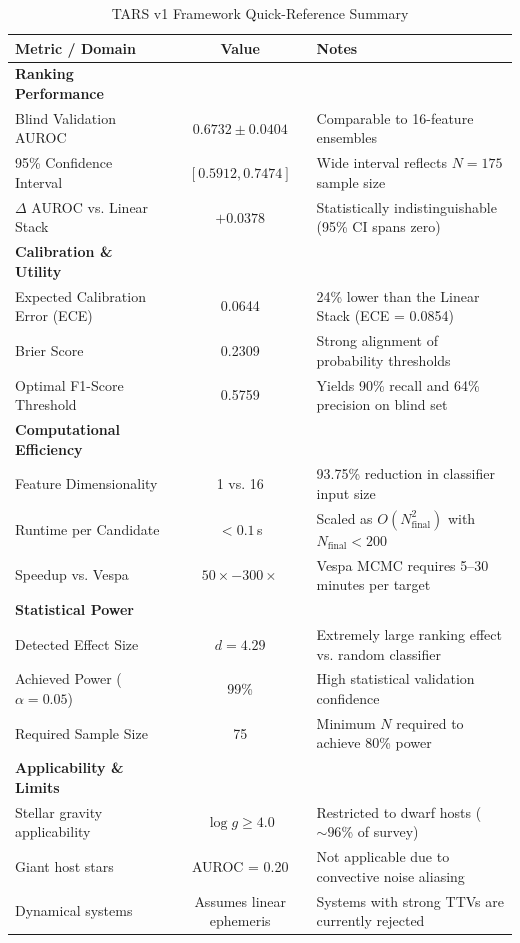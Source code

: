 \begin{table}[htbp]
\centering
\caption{TARS v1 Framework Quick-Reference Summary}
\label{tab:quick_reference}
\begin{tabular}{lcl}
\hline\hline
Metric / Domain & Value & Notes \\
\hline
\textbf{Ranking Performance} & & \\
Blind Validation AUROC & $0.6732 \pm 0.0404$ & \parbox{8.0cm}{Comparable to 16-feature ensembles} \\
95\% Confidence Interval & $[0.5912, 0.7474]$ & \parbox{8.0cm}{Wide interval reflects $N=175$ sample size} \\
$\Delta$ AUROC vs. Linear Stack & $+0.0378$ & \parbox{8.0cm}{Statistically indistinguishable (95\% CI spans zero)} \\
\hline
\textbf{Calibration \& Utility} & & \\
Expected Calibration Error (ECE) & 0.0644 & \parbox{8.0cm}{24\% lower than the Linear Stack (ECE = 0.0854)} \\
Brier Score & 0.2309 & \parbox{8.0cm}{Strong alignment of probability thresholds} \\
Optimal F1-Score Threshold & 0.5759 & \parbox{8.0cm}{Yields 90\% recall and 64\% precision on blind set} \\
\hline
\textbf{Computational Efficiency} & & \\
Feature Dimensionality & 1 vs. 16 & \parbox{8.0cm}{93.75\% reduction in classifier input size} \\
Runtime per Candidate & $<0.1$\,s & \parbox{8.0cm}{Scaled as $O(N_{\text{final}}^2)$ with $N_{\text{final}} < 200$} \\
Speedup vs. Vespa & $50\times - 300\times$ & \parbox{8.0cm}{Vespa MCMC requires 5--30 minutes per target} \\
\hline
\textbf{Statistical Power} & & \\
Detected Effect Size & $d = 4.29$ & \parbox{8.0cm}{Extremely large ranking effect vs. random classifier} \\
Achieved Power ($\alpha=0.05$) & 99\% & \parbox{8.0cm}{High statistical validation confidence} \\
Required Sample Size & 75 & \parbox{8.0cm}{Minimum $N$ required to achieve 80\% power} \\
\hline
\textbf{Applicability \& Limits} & & \\
Stellar gravity applicability & $\log g \ge 4.0$ & \parbox{8.0cm}{Restricted to dwarf hosts ($\sim 96$\% of survey)} \\
Giant host stars & AUROC = 0.20 & \parbox{8.0cm}{Not applicable due to convective noise aliasing} \\
Dynamical systems & Assumes linear ephemeris & \parbox{8.0cm}{Systems with strong TTVs are currently rejected} \\
\hline
\end{tabular}
\end{table}
